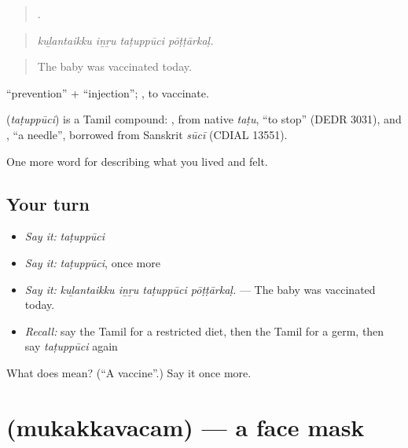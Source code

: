 \begin{quote}
   .
\end{quote}

\begin{quote}
\emph{kuḻantaikku iṉṟu taṭuppūci pōṭṭārkaḷ.}
\end{quote}

\begin{quote}
The baby was vaccinated today.
\end{quote}

 \textquotedblleft{}prevention\textquotedblright{} +  \textquotedblleft{}injection\textquotedblright{};  , to vaccinate.

\begin{cousinweb}
\textbf{} (\emph{taṭuppūci}) is a Tamil compound: , from native  \emph{taṭu}, \textquotedblleft{}to stop\textquotedblright{} (DEDR 3031), and , \textquotedblleft{}a needle\textquotedblright{}, borrowed from Sanskrit \emph{sūcī} (CDIAL 13551).
\end{cousinweb}

\begin{grammarlens}[title={What you've built}]
One more word for describing what you lived and felt.
\end{grammarlens}

\subsection*{Your turn}
\begin{itemize}
\raggedright
  \item \emph{Say it:} \emph{taṭuppūci}
  \item \emph{Say it:} \emph{taṭuppūci}, once more
  \item \emph{Say it:} \emph{kuḻantaikku iṉṟu taṭuppūci pōṭṭārkaḷ.} — The baby was vaccinated today.
  \item \emph{Recall:} say the Tamil for a restricted diet, then the Tamil for a germ, then say \emph{taṭuppūci} again
\end{itemize}

\begin{tcolorbox}[breakable,colback=teal!4,colframe=teal!35!black,title={Before you move on}]
What does  mean? (\textquotedblleft{}A vaccine\textquotedblright{}.) Say it once more.
\end{tcolorbox}
\section[\texorpdfstring{\ta{முகக்கவசம்} (mukakkavacam)}{முகக்கவசம் (mukakkavacam)}]{ (mukakkavacam) — a face mask}

